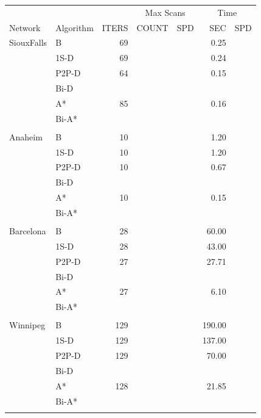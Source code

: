 \begin{table}
    \centering
    \begin{tabular}{l l r rr rr } \toprule
        & & & \multicolumn{2}{c}{Max Scans} & \multicolumn{2}{c}{Time} \\ 
        \cmidrule(lr){4-5}
        \cmidrule(lr){6-7}
        Network & Algorithm & ITERS & COUNT & SPD                     & SEC & SPD \\ 
        \cmidrule(lr){1-1}
        \cmidrule(lr){2-2}
        \cmidrule(lr){3-3}
        \cmidrule(lr){4-4}
        \cmidrule(lr){5-5}
        \cmidrule(lr){6-6}
        \cmidrule(lr){7-7}
        SiouxFalls    & B     & 69 & & & 0.25 & \\
        & 1S-D  & 69 & & & 0.24 & \\
        & P2P-D & 64 & & & 0.15 & \\
        & Bi-D  & & & & & \\
        & A*    & 85 & & & 0.16 & \\
        & Bi-A* & & & & & \\ \\
        Anaheim       & B     & 10 & & & 1.20 & \\
        & 1S-D  & 10 & & & 1.20 & \\
        & P2P-D & 10 & & & 0.67 & \\
        & Bi-D  & & & & & \\
        & A*    & 10 & & & 0.15 & \\
        & Bi-A* & & & & & \\ \\
        Barcelona     & B     & 28 & & & 60.00 & \\
        & 1S-D  & 28 & & & 43.00 & \\
        & P2P-D & 27 & & & 27.71 & \\
        & Bi-D  & & & & & \\
        & A*    & 27 & & &  6.10 & \\
        & Bi-A* & & & & & \\ \\
        Winnipeg      & B     & 129 & & & 190.00 & \\
        & 1S-D  & 129 & & & 137.00 & \\
        & P2P-D & 129 & & &  70.00 & \\
        & Bi-D  & & & & & \\
        & A*    & 128 & & & 21.85 & \\
        & Bi-A* & & & & & \\ \\

\end{tabular}
\end{table}
